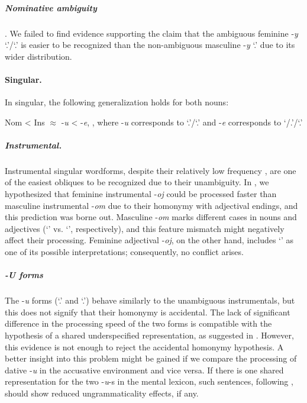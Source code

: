 \documentclass[output=paper, modfonts,newtxmath,hidelinks]{langscibook}
\begin{document}
\subparagraph*{{Nominative ambiguity}}. We failed to find evidence supporting the claim that the ambiguous feminine -\textit{y} `\nomm.\pl'\slash `\genn.\sg' is easier to be recognized than the non-ambiguous masculine -\textit{y} `\nomm.\pl' due to its wider distribution.\\

\paragraph*{Singular.} In singular, the following generalization holds for both nouns:

\ea	Nom < Ins $\approx$ -\textit{u} < -\textit{e}, , where -\textit{u} corresponds to `\accc.\fem'\slash `\datt.\masc' and -\textit{e} corresponds to `{\datt/\locc.\fem}’\slash `{\locc.\masc}’
\z 

\subparagraph*{{Instrumental.}} Instrumental singular wordforms, despite their relatively low frequency \citep{samojlova2014frequencies}, are one of the easiest obliques to be recognized due to their unambiguity. In , we hypothesized that feminine instrumental -\textit{oj} could be processed faster than masculine instrumental -\textit{om} due to their homonymy with adjectival endings, and this prediction was borne out. Masculine -\textit{om} marks different cases in nouns and adjectives (`\ins' vs. `\locc', respectively), and this feature mismatch might negatively affect their processing. Feminine adjectival -\textit{oj}, on the other hand, includes `\ins' as one of its possible interpretations; consequently, no conflict arises.

\subparagraph*{{-U forms}} The -\textit{u} forms (`\accc.\fem' and `\datt.\masc') behave similarly to the unambiguous instrumentals, but this does not signify that their homonymy is accidental. The lack of significant difference in the processing speed of the two forms  is compatible with the hypothesis of a shared underspecified representation, as suggested in  \citet{muller2004decomposing,wunderlich2004there}. However, this evidence is not enough to reject the accidental homonymy hypothesis. A better insight into this problem might be gained if we compare the processing of dative -\textit{u} in the accusative environment and vice versa. If there is one shared representation for the two -\textit{u}-s in the mental lexicon, such sentences, following \citet{penke2004psycholinguistic, opitz2013neurophysiological}, should show reduced ungrammaticality effects, if any.
\end{document}
